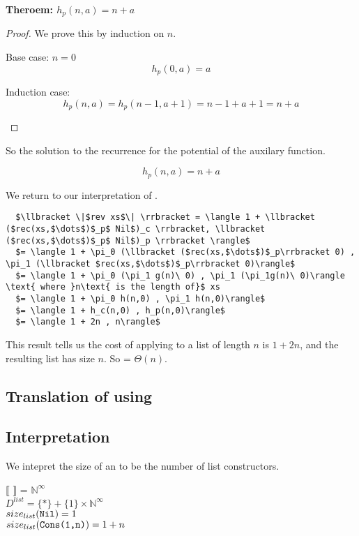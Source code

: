 \textbf{Theroem: $h_p(n,a) = n + a$}
\begin{proof}
  We prove this by induction on $n$.
  \begin{description}
    \item{Base case: $n=0$}\hfill \\
      \[ h_p(0,a) = a \]
    \item{Induction case:}\hfill \\
      \[h_p(n,a) = h_p(n-1,a+1) = n - 1 + a + 1 = n + a\]
  \end{description}
\end{proof}  

So the solution to the recurrence for the potential of the auxilary function.
\begin{framed}
  \[h_p(n,a) = n + a \]
\end{framed}


We return to our interpretation of .
\begin{lstlisting}
  $\llbracket \|$rev xs$\| \rrbracket = \langle 1 + \llbracket ($rec(xs,$\dots$)$_p$ Nil$)_c \rrbracket, \llbracket ($rec(xs,$\dots$)$_p$ Nil$)_p \rrbracket \rangle$
  $= \langle 1 + \pi_0 (\llbracket ($rec(xs,$\dots$)$_p\rrbracket 0) , \pi_1 (\llbracket $rec(xs,$\dots$)$_p\rrbracket 0)\rangle$
  $= \langle 1 + \pi_0 (\pi_1 g(n)\ 0) , \pi_1 (\pi_1g(n)\ 0)\rangle \text{ where }n\text{ is the length of}$ xs
  $= \langle 1 + \pi_0 h(n,0) , \pi_1 h(n,0)\rangle$
  $= \langle 1 + h_c(n,0) , h_p(n,0)\rangle$
  $= \langle 1 + 2n , n\rangle$
\end{lstlisting}

This result tells us the cost of applying  to a list  of length $n$ is $1+2n$, and the resulting list has size $n$.
So  = $\Theta(n)$.




\subsection*{Translation of  using }

\subsection*{Interpretation}

We intepret the size of an  to be the number of list constructors.
\begin{framed}
$\llbracket$  $\rrbracket$ = $\mathbb{N}^\infty$\\
$D^{list} = \{\ast\} + \{1\} \times \mathbb{N}^\infty$\\
$size_{list}(\texttt{Nil}) = 1$\\
$size_{list}(\texttt{Cons(1,n)}) = 1 + n$\\
\end{framed}

